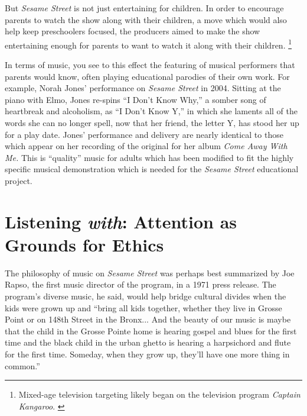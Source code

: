 \documentclass[12pt,letterpaper]{article}
\newcommand{\ses}{\textit{Sesame Street }}
\begin{document}
	But \textit{Sesame Street} is not just entertaining for children. 
	In order to encourage parents to watch the show along with their
	children, a move which would also help keep preschoolers focused,
	the producers aimed to make the show entertaining enough for parents
	to want to watch it along with their children.
	\autocite[294]{Ostrofsky2017}
	\footnote{Mixed-age television targeting likely began on the 
	television program \textit{Captain Kangaroo}. \autocite[46]{Davis}} 
	
	In terms of music, you see to this effect the featuring of musical 
	performers that parents would know, often playing educational parodies 
	of their own work. For example, Norah Jones' performance on \ses in 
	2004.\autocite{4081} Sitting at the piano with Elmo, Jones 
	re-spins ``I Don't Know Why,'' a somber song of heartbreak and 
	alcoholism, as ``I Don't Know Y,'' in which she laments all of the 
	words she can no longer spell, now that her friend, the letter Y, has 
	stood her up for a play date. Jones' performance and delivery are nearly
	identical to those which appear on her recording of the original for her
	album \textit{Come Away With Me.} This is ``quality'' music for adults
	which has been modified to fit the highly specific musical demonstration
	which is needed for the \ses educational project.
		

	\section*{Listening \textit{with}: Attention as Grounds for Ethics}	

	The philosophy of music on \textit{Sesame Street} was perhaps best 
	summarized by Joe Rapso, the first music director of the program, in a
	1971 press release. The program's diverse music, he said, would
	help bridge cultural divides when the kids were grown up and ``bring all
	kids together, whether they live in Grosse Point or on 148th Street in 
	the Bronx... And the beauty of our music is maybe that the child in the
	Grosse Pointe home is hearing gospel and blues for the first time and 
	the black child in the urban ghetto is hearing a harpsichord and flute 
	for the first time. Someday, when they grow up, they'll have one more 
	thing in common.''\autocite[297]{Ostrofsky2012}
\end{document}
